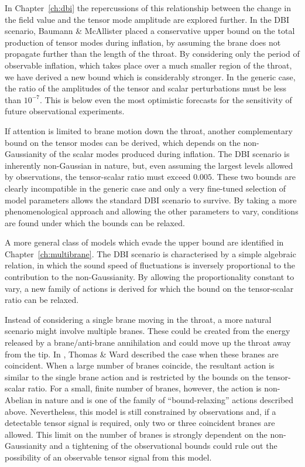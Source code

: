 In Chapter~\ref{ch:dbi} the repercussions of this relationship between the change in
the field value and the tensor mode amplitude are explored further. In the DBI
scenario,
Baumann \& McAllister \cite{bmpaper} placed a conservative
upper bound on the total production of tensor modes during inflation, by assuming the
brane does not propagate further than the length of the throat. By considering only
the
period of observable inflation, which takes place over a much smaller region of the
throat, we have derived a new bound which is considerably stronger. In the
generic
case, the ratio of the amplitudes of the tensor and scalar perturbations must be less
than
$10^{-7}$. This is below  even the most optimistic forecasts for
the sensitivity of future observational experiments. 

If attention is limited to brane motion down the throat, another complementary bound
on the tensor modes can be derived, which depends on the non-Gaussianity of the
scalar modes produced
during inflation. The DBI scenario is inherently non-Gaussian in nature, but, even
assuming the largest levels allowed by observations, the tensor-scalar ratio must
exceed $0.005$. These two bounds are clearly incompatible in the generic
case and only a very fine-tuned selection of model parameters allows the standard DBI
scenario to survive. By taking a more phenomenological approach and allowing the
other parameters to vary,
conditions are found under which the bounds can be relaxed.


A more general class of models which evade the upper bound are identified in
Chapter~\ref{ch:multibrane}. The DBI scenario is characterised by a simple
algebraic relation, in which the sound speed of fluctuations is inversely
proportional to the contribution to the non-Gaussianity. By allowing the
proportionality constant to vary, a new family of actions is derived for which the
bound on the tensor-scalar ratio can be relaxed. 

Instead of considering a single brane moving in the throat, a more natural scenario
might involve multiple branes. These could be created from the energy released by a
brane/anti-brane annihilation and could move up the throat away from the tip.
In , Thomas \& Ward described the case when these branes are
coincident. When a large number of branes coincide, the resultant action is similar
to the single brane action and is restricted by the bounds on the tensor-scalar
ratio. For a small, finite number of branes, however, the action is non-Abelian in
nature and is one of the family of ``bound-relaxing'' actions described above.
Nevertheless, this model is still constrained by observations and, if a detectable
tensor signal is required, only two or three coincident branes
are allowed. This limit on the number of branes is strongly dependent on the
non-Gaussianity and a tightening of the observational bounds could rule out the
possibility of an observable tensor signal from this model.


